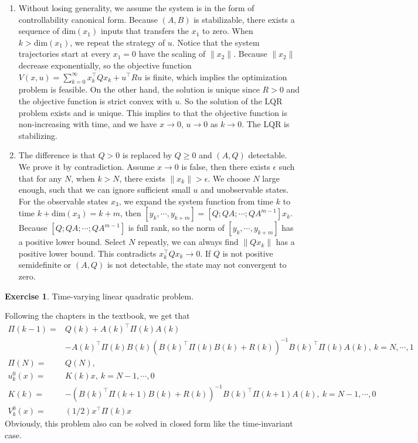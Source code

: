 \documentclass[11pt,a4paper]{report}
\theoremstyle{definition}\newtheorem{exercise}{Exercise}[chapter]
\begin{document}
\begin{answer}
\begin{enumerate}[label=(\alph*)]
    \item Without losing generality, we assume the system is in the form of controllability canonical form. 
    Because $(A,B)$ is stabilizable, there exists a sequence of $\text{dim}(x_1)$ inputs that transfers the $x_1$ to zero. When $k>\text{dim}(x_1)$, we repeat the strategy of $u$. Notice that the system trajectories start at every $x_1=0$ have the scaling of $\|x_2\|$. Because $\|x_2\|$ decrease exponentially, so the objective function $V(x,u)=\sum_{k=0}^\infty x_k^\top Qx_k+u^\top Ru$ is finite, which implies the optimization problem is feasible. On the other hand, the solution is unique since $R>0$ and the objective function is strict convex with $u$.
    So the solution of the LQR problem exists and is unique. This implies to that the objective function is non-increasing with time, and we have $x\to 0$, $u\to 0$ as $k\to 0$. The LQR is stabilizing.

    \item The difference is that $Q>0$ is replaced by $Q\ge 0$ and $(A,Q)$ detectable. We prove it by contradiction. Assume $x\to 0$ is false, then there exists $\epsilon$ such that for any $N$, when $k>N$, there exists $\|x_k\|>\epsilon$. We choose $N$ large enough, such that we can ignore sufficient small $u$ and unobservable states. For the observable states $x_3$, we expand the system function from time $k$ to time $k+\text{dim}(x_3) = k+m$, then $[y_k,\cdots, y_{k+m}]=[Q; QA;\cdots;QA^{m-1}]x_k$. Because $[Q; QA;\cdots;QA^{m-1}]$ is full rank, so the norm of $[y_k,\cdots, y_{k+m}]$ has a positive lower bound. Select $N$ repeatly, we can always find $\|Qx_k\|$ has a positive lower bound. This contradicts $x_k^\top Qx_k\to 0$. If $Q$ is not positive semidefinite or $(A,Q)$ is not detectable, the state may not convergent to zero.
\end{enumerate}
\end{answer}

\begin{exercise}Time-varying linear quadratic problem.\\
\end{exercise}
\begin{answer}
Following the chapters in the textbook, we get that
\begin{align*}
    \Pi(k-1)=&Q(k)+A(k)^\top\Pi(k)A(k)\\
    &-A(k)^\top\Pi(k)B(k)(B(k)^\top\Pi(k)B(k)+R(k))^{-1}B(k)^\top\Pi(k)A(k),~k=N,\cdots,1\\
    \Pi(N)=&Q(N),\\
    u_k^0(x)=&K(k)x,~k=N-1,\cdots,0\\
    K(k)=&-(B(k)^\top\Pi(k+1)B(k)+R(k))^{-1}B(k)^\top\Pi(k+1)A(k),~k=N-1,\cdots,0\\
    V_k^0(x)=&(1/2)x^\top\Pi(k)x
\end{align*}
Obviously, this problem also can be solved in closed form like the time-invariant case.
\end{answer}
\end{document}
